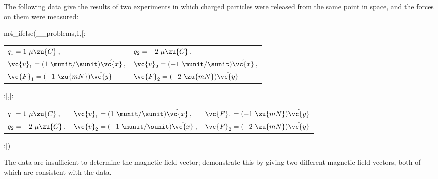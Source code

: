         The following data give the results of two experiments in which charged particles
        were released from the same point in space, and the forces on them were measured:
        
m4_ifelse(__problems,1,[:
        \begin{tabular}{ll}
                $q_1=1\ \mu\zu{C}\:,$ &
                       $q_2=-2\ \mu\zu{C}\:,$ \\
                $\vc{v}_1=(1\ \munit/\sunit)\hat{\vc{x}}\:,$ &
                       $\vc{v}_2=(-1\ \munit/\sunit)\hat{\vc{x}}\:,$ \\
                $\vc{F}_1=(-1\ \zu{mN})\hat{\vc{y}}$ &
                       $\vc{F}_2=(-2\ \zu{mN})\hat{\vc{y}}$\\
        \end{tabular}
:],[:
        \begin{tabular}{lll}
                $q_1=1\ \mu\zu{C}\:,$ & $\vc{v}_1=(1\ \munit/\sunit)\hat{\vc{x}}\:,$ & $\vc{F}_1=(-1\ \zu{mN})\hat{\vc{y}}$\\
                $q_2=-2\ \mu\zu{C}\:,$ & $\vc{v}_2=(-1\ \munit/\sunit)\hat{\vc{x}}\:,$ & $\vc{F}_2=(-2\ \zu{mN})\hat{\vc{y}}$\\
        \end{tabular}
:])

        \noindent The data are insufficient to determine the magnetic field vector; demonstrate this
        by giving two different magnetic field vectors, both of which are consistent with the data.
